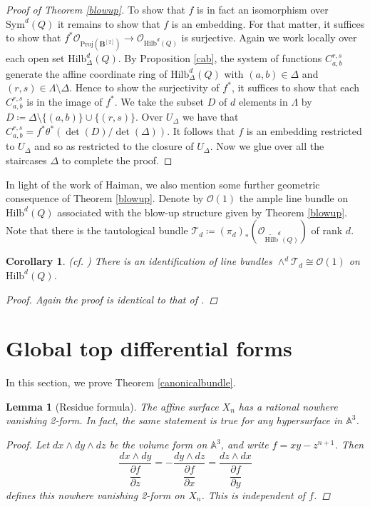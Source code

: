 \documentclass{amsart}[12pt]
\newtheorem{lemma}[theorem]{Lemma}
\newtheorem{cor}[theorem]{Corollary}
\theoremstyle{definition}
\theoremstyle{remark}
\numberwithin{equation}{section}
\begin{document}
\begin{proof}[Proof of Theorem \ref{blowup}]
To show that $f$ is in fact an isomorphism over $\mathrm{Sym}^d(Q)$ it remains to show that $f$ is an embedding. For that matter, it suffices to show that $f^*\mathcal{O}_{\mathrm{Proj}(\mathbf{B}^{[2]})} \to \mathcal{O}_{\mathrm{Hilb}^d(Q)}$ is surjective. Again we work locally over each open set $\mathrm{Hilb}^d_{\Delta}(Q)$. By Proposition \ref{cab}, the system of functions $C_{a, b}^{r, s}$ generate the affine coordinate ring of $\mathrm{Hilb}^d_{\Delta}(Q)$ with $(a, b) \in \Delta$ and $(r, s) \in \Lambda \setminus \Delta$. Hence to show the surjectivity of $f^*$, it suffices to show that each $C_{a, b}^{r, s}$ is in the image of $f^*$. We take the subset $D$ of $d$ elements in $\Lambda$ by $D \coloneqq \Delta \setminus \{(a, b)\} \cup \{(r, s)\}$. Over $U_{\Delta}$ we have that $C_{a, b}^{r, s} = f^*\theta^*(\det(D)/\det(\Delta))$. It follows that $f$ is an embedding restricted to $U_{\Delta}$ and so as restricted to the closure of $U_{\Delta}$. Now we glue over all the staircases $\Delta$ to complete the proof.
\end{proof}

In light of the work of Haiman, we also mention some further geometric consequence of Theorem \ref{blowup}. Denote by $\mathcal{O}(1)$ the ample line bundle on $\mathrm{Hilb}^d(Q)$ associated with the blow-up structure given by Theorem \ref{blowup}. Note that there is the tautological bundle $\mathcal{T}_d \coloneqq (\pi_d)_*(\mathcal{O}_{\widetilde{\mathrm{Hilb}}^d(Q)})$ of rank $d$. 

\begin{cor}(cf. \cite[Proposition 2.12]{H98})
There is an identification of line bundles $\wedge^d \mathcal{T}_d \cong \mathcal{O}(1)$ on $\mathrm{Hilb}^d(Q)$.
\begin{proof}
Again the proof is identical to that of \cite[Proposition 2.12]{H98}. 
\end{proof}
\end{cor}

\section{Global top differential forms}

In this section, we prove Theorem \ref{canonicalbundle}.
\begin{lemma}[Residue formula]
The affine surface $X_n$ has a rational nowhere vanishing 2-form. In fact, the same statement is true for any hypersurface in $\mathbb{A}^3$.
\begin{proof}
Let $dx \wedge dy \wedge dz$ be the volume form on $\mathbb{A}^3$, and write $f = xy - z^{n + 1}$. Then 
\[
\dfrac{dx \wedge dy}{\dfrac{\partial f}{\partial z}} = - \dfrac{dy \wedge dz}{\dfrac{\partial f}{\partial x}} = \dfrac{dz \wedge dx}{\dfrac{\partial f}{\partial y}}  
\]
defines this nowhere vanishing 2-form on $X_n$. This is independent of $f$.
\end{proof}
\end{lemma}
\end{document}

